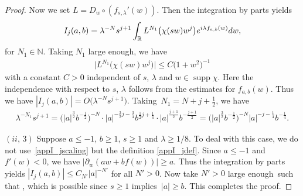 \documentclass[10pt,a4paper]{article}
\numberwithin{equation}{section}
\def\R{\mathbb{R}}%
\DeclareMathOperator{\supp}{supp}%
\def\l{\lambda}
\def\pa{\partial}
\begin{document}
\begin{proof}
Now we set $L=D_w\circ(f_{s,\l}'(w))$. Then the integration by parts yields
\begin{align*}
I_j(a,b)= \l^{-N}s^{j+1}\int_{\R}L^{N_1}\bigl(\chi(sw)w^j\bigr){\rm e}^{{\rm i}\l f_{a,b}(w)}{\rm d}w,
\end{align*}
for $N_1\in\mathbb{N}$. Taking $N_1$ large enough, we have
\begin{align*}
\big|L^{N_1}\bigl(\chi(sw)w^j\bigr)\big|\leq C\bigl(1+w^2\bigr)^{-1}
\end{align*}
with a constant $C>0$ independent of $s$, $\l$ and $w\in \supp \chi$. Here the independence with respect to $s$, $\l$ follows from the estimates for $f_{a,b}(w)$. Thus we have $|I_j(a,b)|=O\bigl(\l^{-N}s^{j+1}\bigr)$.
Taking~${N_1=N+j+\frac{1}{2}}$, we have
\begin{align*}
\l^{-N_1}s^{j+1}=\bigl(|a|^{\frac{3}{2}}b^{-\frac{1}{2}}\bigr)^{-N}\cdot |a|^{-\frac{3}{2}j-\frac{3}{4}}b^{\frac{1}{2}j+\frac{1}{4}} \cdot |a|^{\frac{j+1}{2}}b^{-\frac{j+1}{2}}=\bigl(|a|^{\frac{3}{2}}b^{-\frac{1}{2}}\bigr)^{-N}|a|^{-j-\frac{1}{4}}b^{-\frac{1}{4}}.
\end{align*}

 $(ii,\,3)$ Suppose $a\leq -1$, $b\geq 1$, $s\geq 1$ and $\l\geq 1/8$. To deal with this case, we do not use~\eqref{appI_jscaling} but the definition \eqref{appI_jdef}. Since $a\leq -1$ and $f'(w)<0$, we have $|\pa_w(aw+bf(w))|\geq a$. Thus the integration by parts yields $|I_j(a,b)|\leq C_{N'}|a|^{-N'}$ for all $N'>0$. Now take $N'>0$ large enough~such that , which is possible since $s\geq 1$ implies~${|a|\geq b}$. This completes the proof.
\end{proof}
\end{document}

